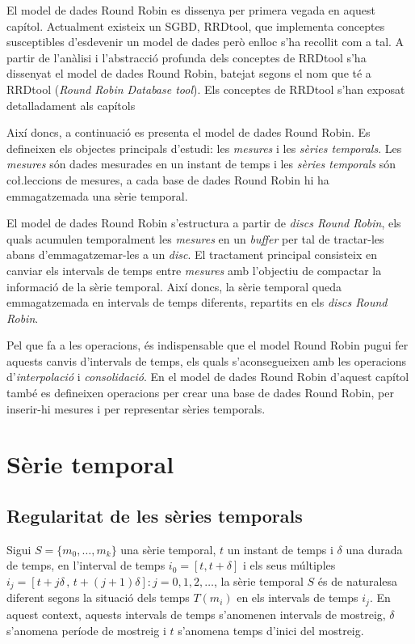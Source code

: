 El model de dades Round Robin es dissenya per primera vegada en aquest capítol. 
Actualment existeix un SGBD, RRDtool, que implementa conceptes susceptibles d'esdevenir un model de dades però enlloc s'ha recollit com a tal. A partir de l'anàlisi i l'abstracció profunda dels conceptes de RRDtool s'ha dissenyat el model de dades Round Robin, batejat segons el nom que té a RRDtool (\emph{Round Robin Database tool}). Els conceptes de RRDtool s'han exposat detalladament als capítols %


Així doncs, a continuació es presenta el model de dades Round Robin. 
Es defineixen els objectes principals d'estudi: les \emph{mesures} i les \emph{sèries temporals}. Les \emph{mesures} són dades mesurades en un instant de temps i les \emph{sèries temporals} són co\l.leccions de mesures, a cada base de dades Round Robin hi ha emmagatzemada una sèrie temporal. 

El model de dades Round Robin s'estructura a partir de \emph{discs Round Robin}, els quals  acumulen temporalment les \emph{mesures} en un \emph{buffer} per tal de tractar-les abans d'emmagatzemar-les  a un \emph{disc}. El tractament principal consisteix en canviar els intervals de temps entre \emph{mesures} amb l'objectiu de compactar la informació de la sèrie temporal.
Així doncs, la sèrie temporal queda emmagatzemada en intervals de temps diferents, repartits en els \emph{discs Round Robin}. 

Pel que fa a les operacions, és indispensable que el model Round Robin pugui fer aquests canvis d'intervals de temps, els quals s'aconsegueixen amb les operacions d'\emph{interpolació} i \emph{consolidació}. En el model de dades Round Robin d'aquest capítol també es defineixen operacions per crear una base de dades Round Robin, per inserir-hi mesures i per representar sèries temporals.



\section{Sèrie temporal}

\subsection{Regularitat de les sèries temporals} 

Sigui $S=\{m_0,\ldots,m_k\}$ una sèrie temporal, $t$ un instant de temps i $\delta$ una durada de temps, en l'interval de temps $i_0=[t,t+\delta]$ i els seus múltiples $i_j=[t+j\delta \,,\, t+(j+1)\delta]: j=0,1,2,\ldots$,  
la sèrie temporal $S$ és de naturalesa diferent segons la situació dels temps $T(m_i)$ en els intervals de temps $i_j$.
En aquest context, aquests intervals de temps s'anomenen intervals de mostreig, $\delta$ s'anomena període de mostreig i $t$ s'anomena temps d'inici del mostreig.

